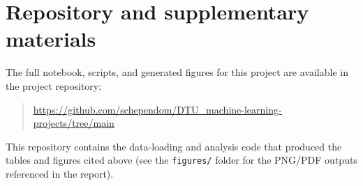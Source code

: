 \documentclass[dtu]{dtuarticle}
\begin{document}
	
	

%
	\appendix
	\section{Repository and supplementary materials}
	The full notebook, scripts, and generated figures for this project are available in the project repository:
	\begin{quote}
	\url{https://github.com/schependom/DTU_machine-learning-projects/tree/main}
	\end{quote}
	This repository contains the data-loading and analysis code that produced the tables and figures cited
	above (see the \texttt{figures/} folder for the PNG/PDF outputs referenced in the report).
%

\end{document}

